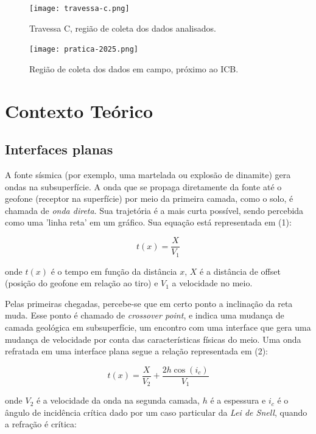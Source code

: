 \documentclass[a4paper,12pt]{article}
\begin{document}
\begin{figure}[H]
    \centering
    \texttt{[image: travessa-c.png]}
    \caption{Travessa C, região de coleta dos dados analisados.}
    \label{fig:placeholder}
\end{figure}


\begin{figure}[H]
    \centering
    \texttt{[image: pratica-2025.png]}
    \caption{Região de coleta dos dados em campo, próximo ao ICB.}
    \label{fig:placeholder}
\end{figure}



\section{Contexto Teórico}

\subsection{Interfaces planas}

A fonte sísmica (por exemplo, uma martelada ou explosão de dinamite) gera ondas na subsuperfície. A onda que se propaga diretamente da fonte até o geofone (receptor na superfície) por meio da primeira camada, como o solo, é chamada de \textit{onda direta}. Sua trajetória é a mais curta possível, sendo percebida como uma 'linha reta' em um gráfico. Sua equação está representada em (1):

\begin{equation}
    t(x) = \frac{X}{V_1}
\end{equation}

\noindent
onde $t(x)$ é o tempo em função da distância $x$, $X$ é a distância de offset (posição do geofone em relação ao tiro) e $V_1$ a velocidade no meio.


Pelas primeiras chegadas, percebe-se que em certo ponto a inclinação da reta muda. Esse ponto é chamado de \textit{crossover point}, e indica uma mudança de camada geológica em subsuperfície, um encontro com uma interface que gera uma mudança de velocidade por conta das características físicas do meio. Uma onda refratada em uma interface plana segue a relação representada em (2):

\begin{equation}
    t(x) =  \frac{X}{V_2} + \frac{2h \cos(i_c)}{V_1}
\end{equation}

\noindent
onde $V_2$ é a velocidade da onda na segunda camada, $h$ é a espessura e $i_c$ é o ângulo de incidência crítica dado por um caso particular da \textit{Lei de Snell}, quando a refração é crítica:
\end{document}
